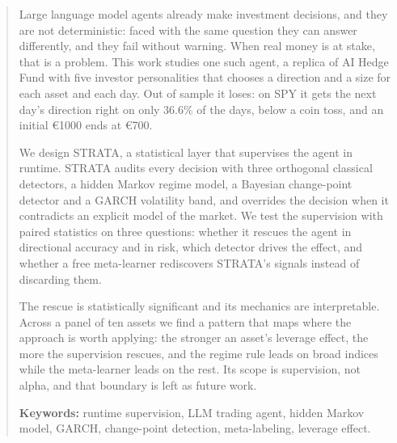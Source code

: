 \renewcommand{\abstractname}{Abstract}
\begin{abstract}
    Large language model agents already make investment decisions, and they are not deterministic: faced with the same question they can answer differently, and they fail without warning. When real money is at stake, that is a problem. This work studies one such agent, a replica of AI Hedge Fund with five investor personalities that chooses a direction and a size for each asset and each day. Out of sample it loses: on SPY it gets the next day's direction right on only $36.6\%$ of the days, below a coin toss, and an initial \euro{}1000 ends at \euro{}700.
    
    We design STRATA, a statistical layer that supervises the agent in runtime. STRATA audits every decision with three orthogonal classical detectors, a hidden Markov regime model, a Bayesian change-point detector and a GARCH volatility band, and overrides the decision when it contradicts an explicit model of the market. We test the supervision with paired statistics on three questions: whether it rescues the agent in directional accuracy and in risk, which detector drives the effect, and whether a free meta-learner rediscovers STRATA's signals instead of discarding them.
    
    The rescue is statistically significant and its mechanics are interpretable. Across a panel of ten assets we find a pattern that maps where the approach is worth applying: the stronger an asset's leverage effect, the more the supervision rescues, and the regime rule leads on broad indices while the meta-learner leads on the rest. Its scope is supervision, not alpha, and that boundary is left as future work.
    
    \medskip
    \noindent\textbf{Keywords:} runtime supervision, LLM trading agent, hidden Markov model, GARCH, change-point detection, meta-labeling, leverage effect.
    \end{abstract}
    